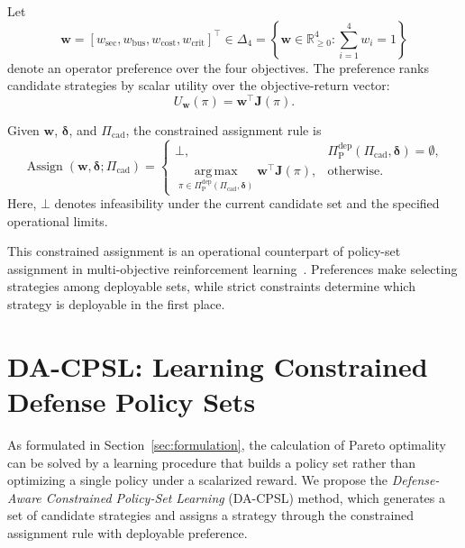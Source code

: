 \documentclass[sigconf,review,anonymous]{acmart}
\begin{document}
Let
\begin{equation}
\mathbf{w}
=
\left[
w_{\mathrm{sec}},
w_{\mathrm{bus}},
w_{\mathrm{cost}},
w_{\mathrm{crit}}
\right]^{\top}
\in \Delta_4=
\left\{
\mathbf{w}\in\mathbb{R}_{\geq 0}^{4}:
\sum_{i=1}^{4} w_i=1
\right\}
\label{eq:preference-simplex}
\end{equation}
denote an operator preference over the four objectives. The preference
ranks candidate strategies by scalar utility over the objective-return
vector:
\begin{equation}
U_{\mathbf{w}}(\pi)
=
\mathbf{w}^{\top}
\mathbf{J}(\pi).
\label{eq:calibrated-objective}
\end{equation}

Given \(\mathbf{w}\), \(\boldsymbol{\delta}\), and
\(\Pi_{\mathrm{cad}}\), the constrained assignment rule is
\begin{equation}
\operatorname{Assign}
(\mathbf{w},\boldsymbol{\delta};\Pi_{\mathrm{cad}})
=
\begin{cases}
\bot,
&
\Pi_{\mathrm{P}}^{\mathrm{dep}}
(\Pi_{\mathrm{cad}},\boldsymbol{\delta})
=
\emptyset,
\\[4pt]
\operatorname*{arg\,max}\limits_{\pi\in
\Pi_{\mathrm{P}}^{\mathrm{dep}}
(\Pi_{\mathrm{cad}},\boldsymbol{\delta})}
\mathbf{w}^{\top}\mathbf{J}(\pi),
&
\text{otherwise}.
\end{cases}
\label{eq:constrained-assignment}
\end{equation}
Here, \(\bot\) denotes infeasibility under the current candidate set and
the specified operational limits.

This constrained assignment is an operational counterpart of policy-set assignment in multi-objective reinforcement learning~\cite{vanmoffaert2014sets,zahavy2021policies,liu2025cmorl}.
Preferences make selecting strategies among deployable sets, while strict constraints determine which strategy is deployable in the first place.


\section{DA-CPSL: Learning Constrained Defense Policy Sets}
\label{sec:learning}

As formulated in Section~\ref{sec:formulation}, the calculation of Pareto optimality can be solved by a learning procedure that builds a policy set rather than optimizing a single policy under a scalarized reward. 
We propose the \emph{Defense-Aware Constrained Policy-Set Learning} (DA-CPSL) method, which generates a set of candidate strategies and assigns a strategy through the constrained assignment rule with deployable preference.
\end{document}
